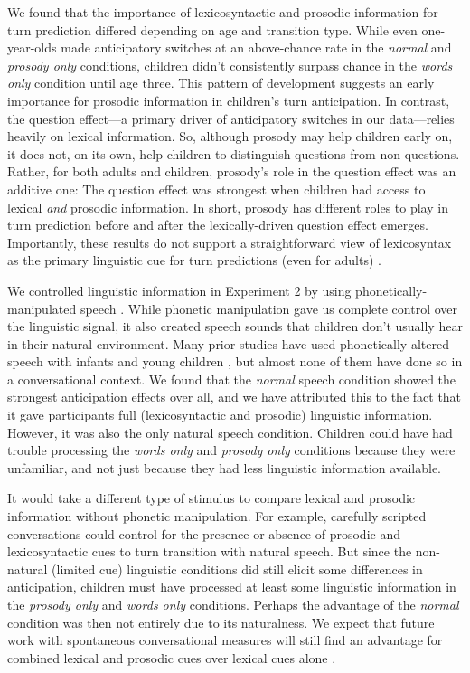 \documentclass[authoryear, 12pt]{elsarticle}
\begin{document}
We found that the importance of lexicosyntactic and prosodic information for turn prediction differed depending on age and transition type. While even one-year-olds made anticipatory switches at an above-chance rate in the \textit{normal} and \textit{prosody only} conditions, children didn't consistently surpass chance in the \textit{words only} condition until age three. This pattern of development suggests an early importance for prosodic information in children's turn anticipation. In contrast, the question effect---a primary driver of anticipatory switches in our data---relies heavily on lexical information. So, although prosody may help children early on, it does not, on its own, help children to distinguish questions from non-questions. Rather, for both adults and children, prosody's role in the question effect was an additive one: The question effect was strongest when children had access to lexical \textit{and} prosodic information. In short, prosody has different roles to play in turn prediction before and after the lexically-driven question effect emerges. Importantly, these results do not support a straightforward view of lexicosyntax as the primary linguistic cue for turn predictions (even for adults) \citep{de-ruiter2006, magyari2012}.

We controlled linguistic information in Experiment 2 by using phonetically-manipulated speech \citep{de-ruiter2006}. While phonetic manipulation gave us complete control over the linguistic signal, it also created speech sounds that children don't usually hear in their natural environment. Many prior studies have used phonetically-altered speech with infants and young children \citep[cf.][]{jusczyk2000}, but almost none of them have done so in a conversational context. We found that the \textit{normal} speech condition showed the strongest anticipation effects over all, and we have attributed this to the fact that it gave participants full (lexicosyntactic and prosodic) linguistic information. However, it was also the only natural speech condition. Children could have had trouble processing the \textit{words only} and \textit{prosody only} conditions because they were unfamiliar, and not just because they had less linguistic information available. 

It would take a different type of stimulus to compare lexical and prosodic information without phonetic manipulation. For example, carefully scripted conversations could control for the presence or absence of prosodic and lexicosyntactic cues to turn transition with natural speech. But since the non-natural (limited cue) linguistic conditions did still elicit some differences in anticipation, children must have processed at least some linguistic information in the \textit{prosody only} and \textit{words only} conditions. Perhaps the advantage of the \textit{normal} condition was then not entirely due to its naturalness. We expect that future work with spontaneous conversational measures will still find an advantage for combined lexical and prosodic cues over lexical cues alone \citep[see also][]{duncan1972, ford1996, torreiraUndRev}.
\end{document}

